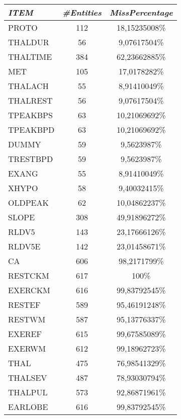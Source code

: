 \documentclass[a4paper,12pt]{article}
\begin{document}
\begin{multicols}{2}
\begin{tabular}{|l|c|c|}
            \end{tabular}
            \begin{tabular}{|l|c|c|} \hline    
                
                \textit{ITEM} & \textit{\#Entities} & \textit{MissPercentage} \\
                \hline PROTO    &112&   18,15235008\% \\
                \hline THALDUR& 56& 9,07617504\% \\
                \hline THALTIME&    384&    62,23662885\% \\
                \hline MET  &105    &17,0178282\% \\
                \hline THALACH& 55  &8,91410049\% \\
                \hline THALREST&    56  &9,07617504\% \\
                \hline TPEAKBPS &63&    10,21069692\% \\
                \hline TPEAKBPD &63&    10,21069692\% \\
                \hline DUMMY    &59&    9,5623987\% \\
                \hline TRESTBPD&    59& 9,5623987\% \\
                \hline EXANG    &55&    8,91410049\% \\
                \hline XHYPO    &58&    9,40032415\% \\
                \hline OLDPEAK& 62& 10,04862237\% \\
                \hline SLOPE    &308    &49,91896272\% \\
                \hline RLDV5    &143    &23,17666126\% \\
                \hline RLDV5E&  142 &23,01458671\% \\
                \hline CA   &606&   98,2171799\% \\
                \hline RESTCKM  &617&   100\% \\
                \hline EXERCKM  &616&   99,83792545\% \\
                \hline RESTEF   &589&   95,46191248\% \\
                \hline RESTWM   &587&   95,13776337\% \\
                \hline EXEREF   &615&   99,67585089\% \\
                \hline EXERWM   &612&   99,18962723\% \\
                \hline THAL&    475&    76,98541329\% \\
                \hline THALSEV& 487 &78,93030794\% \\
                \hline THALPUL& 573 &92,86871961\% \\
                \hline EARLOBE& 616&    99,83792545\% \\ \hline
            
            \end{tabular}
            
        \end{multicols}
\end{document}

